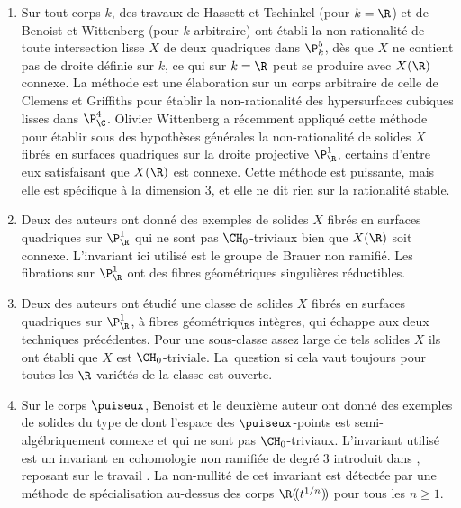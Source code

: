 \begin{enumerate}
\item Sur tout corps $k$, des travaux de Hassett et Tschinkel \cite{hassett2021rationality} (pour $k=\R$) et de Benoist et Wittenberg \cite{benoist2019intermediate} (pour $k$ arbitraire) ont établi
la non-rationalité de toute intersection lisse $X$ de deux quadriques
dans $\P^5_{k}$, dès que $X$ ne contient
pas de droite définie sur $k$, ce qui sur $k=\R$ peut se produire avec $X(\R)$ connexe.
La méthode est une élaboration sur un corps arbitraire de celle de Clemens et
Griffiths pour établir la non-rationalité des hypersurfaces cubiques lisses dans $\P^4_{\C}$.
Olivier Wittenberg a récemment appliqué cette méthode pour établir sous des hypothèses générales la non-rationalité
de solides $X$ fibrés en surfaces quadriques sur la droite projective $\P^1_{\R}$, certains d'entre eux satisfaisant que $X(\R)$ est connexe. Cette méthode est puissante, mais elle est spécifique à la dimension $3$, et elle ne dit rien sur la rationalité stable.

\item Deux des auteurs \cite{colliot2024certaines} ont donné des exemples de solides $X$ fibrés en surfaces quadriques sur $\P^1_{\R}$
qui ne sont pas $\CH_{0}$-triviaux bien que $X(\R)$
soit connexe. L'invariant ici utilisé est le groupe de Brauer non ramifié.
Les fibrations sur $\P^1_{\R}$ ont des fibres géométriques singulières réductibles.
\item Deux des auteurs \cite{colliot2024certaines} ont étudié une classe de
solides $X$ fibrés en surfaces quadriques sur $\P^1_{\R}$, à fibres géométriques intègres, qui échappe aux deux techniques précédentes. Pour une sous-classe assez large de tels solides $X$ ils ont établi
que $X$ est $\CH_{0}$-triviale. La~question si cela vaut toujours pour toutes les $\R$-variétés de la classe est ouverte.
\item Sur le corps $\puiseux$, Benoist et le deuxième auteur \cite{benoist2026rationality} ont donné
des exemples de solides du type de \cite{colliot2024certaines}
dont l'espace des $\puiseux$-points est semi-algébriquement connexe et
qui ne sont pas $\CH_{0}$-triviaux. L'invariant utilisé
est un invariant en cohomologie non ramifiée de degré $3$ introduit dans \cite{colliot2024certaines}, reposant sur le travail \cite{colliot1993groupe}.
La non-nullité de cet invariant est détectée par
une méthode de spécialisation au-dessus des corps
$\R(\!(t^{1/n})\!)$ pour tous les $n\geq 1$.
\end{enumerate}

